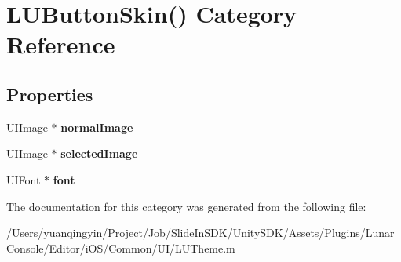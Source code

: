\hypertarget{category_l_u_button_skin_07_08}{}\section{L\+U\+Button\+Skin() Category Reference}
\label{category_l_u_button_skin_07_08}
\subsection*{Properties}
\begin{DoxyCompactItemize}
\item 
\mbox{\label{category_l_u_button_skin_07_08_a2a8bcd1ac21344680d65a4b825c5df88}} 
U\+I\+Image $\ast$ {\bfseries normal\+Image}
\item 
\mbox{\label{category_l_u_button_skin_07_08_a3486690ac5f06d33be4632f4d00bbd62}} 
U\+I\+Image $\ast$ {\bfseries selected\+Image}
\item 
\mbox{\label{category_l_u_button_skin_07_08_a935258efbfda8a26b2bd83a54d86dba5}} 
U\+I\+Font $\ast$ {\bfseries font}
\end{DoxyCompactItemize}


The documentation for this category was generated from the following file\+:\begin{DoxyCompactItemize}
\item 
/\+Users/yuanqingyin/\+Project/\+Job/\+Slide\+In\+S\+D\+K/\+Unity\+S\+D\+K/\+Assets/\+Plugins/\+Lunar\+Console/\+Editor/i\+O\+S/\+Common/\+U\+I/L\+U\+Theme.\+m\end{DoxyCompactItemize}
